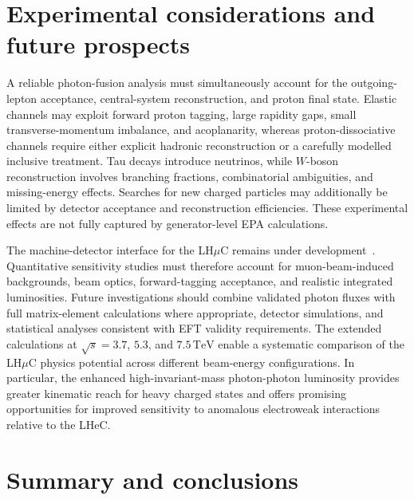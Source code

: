 \documentclass[11pt,a4paper]{article}
\newcommand{\TeV}{\,\mathrm{TeV}}
\begin{document}
\section{Experimental considerations and future prospects}



A reliable photon-fusion analysis must simultaneously account for
the outgoing-lepton acceptance, central-system reconstruction, and
proton final state. Elastic channels may exploit forward proton
tagging, large rapidity gaps, small transverse-momentum imbalance,
and acoplanarity, whereas proton-dissociative channels require
either explicit hadronic reconstruction or a carefully modelled
inclusive treatment. Tau decays introduce neutrinos, while
$W$-boson reconstruction involves branching fractions, combinatorial
ambiguities, and missing-energy effects. Searches for new charged
particles may additionally be limited by detector acceptance and
reconstruction efficiencies. These experimental effects are not
fully captured by generator-level EPA calculations.

The machine-detector interface for the LH$\mu$C remains under
development~\cite{Piotrzkowski2026}. Quantitative sensitivity
studies must therefore account for muon-beam-induced backgrounds,
beam optics, forward-tagging acceptance, and realistic integrated
luminosities. Future investigations should combine validated
photon fluxes with full matrix-element calculations where
appropriate, detector simulations, and statistical analyses
consistent with EFT validity requirements. The extended calculations
at $\sqrt{s}=3.7$, $5.3$, and $7.5\TeV$ enable a systematic
comparison of the LH$\mu$C physics potential across different
beam-energy configurations. In particular, the enhanced
high-invariant-mass photon-photon luminosity provides greater
kinematic reach for heavy charged states and offers promising
opportunities for improved sensitivity to anomalous electroweak
interactions relative to the LHeC.




\section{Summary and conclusions}
\end{document}

